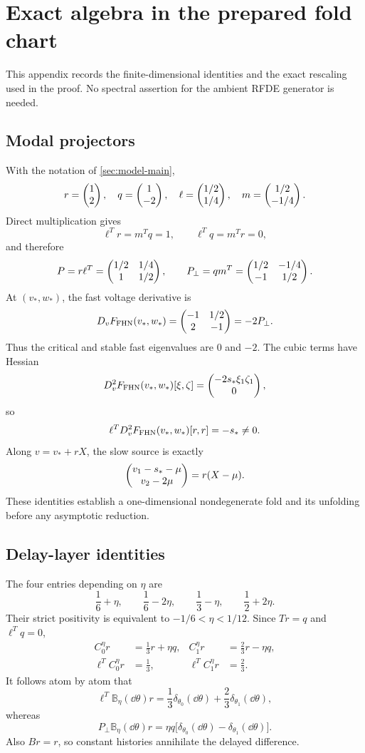 \section{Exact algebra in the prepared fold chart}
\label{app:exact-algebra}

This appendix records the finite-dimensional identities and the exact
rescaling used in the proof.  No spectral assertion for the ambient RFDE
generator is needed.

\subsection{Modal projectors}

With the notation of \cref{sec:model-main},
\[
 r=\begin{pmatrix}1\\2\end{pmatrix},\quad q=\begin{pmatrix}1\\-2\end{pmatrix},\quad
 \ell=\begin{pmatrix}1/2\\1/4\end{pmatrix},\quad m=\begin{pmatrix}1/2\\-1/4\end{pmatrix}.
\]
Direct multiplication gives
\[
 \ell^Tr=m^Tq=1,\qquad \ell^Tq=m^Tr=0,
\]
and therefore
\[
 P=r\ell^T=\begin{pmatrix}1/2&1/4\\1&1/2\end{pmatrix},\qquad
 P_\perp=qm^T=\begin{pmatrix}1/2&-1/4\\-1&1/2\end{pmatrix}.
\]
At \((v_*,w_*)\), the fast voltage derivative is
\[
 D_vF_{\rm FHN}(v_*,w_*)=\begin{pmatrix}-1&1/2\\2&-1\end{pmatrix}=-2P_\perp.
\]
Thus the critical and stable fast eigenvalues are \(0\) and \(-2\).
The cubic terms have Hessian
\[
 D_v^2F_{\rm FHN}(v_*,w_*)[\xi,\zeta]
 =\begin{pmatrix}-2s_*\xi_1\zeta_1\\0\end{pmatrix},
\]
so
\[
 \ell^TD_v^2F_{\rm FHN}(v_*,w_*)[r,r]=-s_*\ne0.
\]
Along \(v=v_*+rX\), the slow source is exactly
\[
 \begin{pmatrix}v_1-s_*-\mu\\v_2-2\mu\end{pmatrix}=r(X-\mu).
\]
These identities establish a one-dimensional nondegenerate fold and its
unfolding before any asymptotic reduction.

\subsection{Delay-layer identities}

The four entries depending on \(\eta\) are
\[
 \frac16+\eta,\qquad \frac16-2\eta,\qquad
 \frac13-\eta,\qquad \frac12+2\eta.
\]
Their strict positivity is equivalent to
\(-1/6<\eta<1/12\).  Since \(Tr=q\) and \(\ell^Tq=0\),
\begin{align*}
 C_0^\eta r&=\frac13r+\eta q,&
 C_1^\eta r&=\frac23r-\eta q,\\
 \ell^TC_0^\eta r&=\frac13,&
 \ell^TC_1^\eta r&=\frac23.
\end{align*}
It follows atom by atom that
\[
 \ell^T\mathbb B_\eta(\dd\theta)r
 =\frac13\delta_{\theta_0}(\dd\theta)
  +\frac23\delta_{\theta_1}(\dd\theta),
\]
whereas
\[
 P_\perp\mathbb B_\eta(\dd\theta)r
 =\eta q\bigl[\delta_{\theta_0}(\dd\theta)
              -\delta_{\theta_1}(\dd\theta)\bigr].
\]
Also \(Br=r\), so constant histories annihilate the delayed difference.


